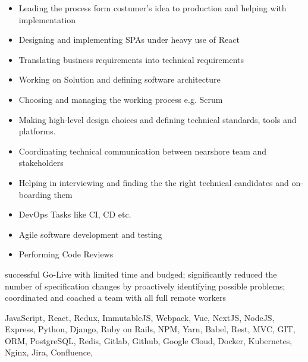 \documentclass[9pt,a4paper]{altacv}
\begin{document}
%
\makebox[0pt][l]{%
  \hspace{-4cm}
  \raisebox{-\totalheight}[0pt][0pt]{%
   {\color{background}\fontsize{250}{48}\faRocket}
}}%

%


\begin{itemize}
\item Leading the process form costumer's idea to production and helping with implementation
\item Designing and implementing SPAs under heavy use of React
\item Translating business requirements into technical requirements
\item Working on Solution and defining software architecture
\item Choosing and managing the working process e.g. Scrum
\item Making high-level design choices and defining technical standards, tools and platforms.
\item Coordinating technical communication between nearshore team and stakeholders
\item Helping in interviewing and finding the the right technical candidates and on-boarding them
\item DevOps Tasks like CI, CD etc.
\item Agile software development and testing
\item Performing Code Reviews
\end{itemize}

successful Go-Live with limited time and budged;
significantly reduced the number of specification changes by proactively identifying possible problems;
coordinated and coached a team with all full remote workers

JavaScript, React, Redux, ImmutableJS, Webpack, Vue, NextJS, NodeJS, Express,
Python, Django, Ruby on Rails, NPM, Yarn, Babel,
Rest, MVC, GIT, ORM, PostgreSQL, Redis,
Gitlab, Github, Google Cloud, Docker, Kubernetes, Nginx,
Jira, Confluence,

\divider
\end{document}

